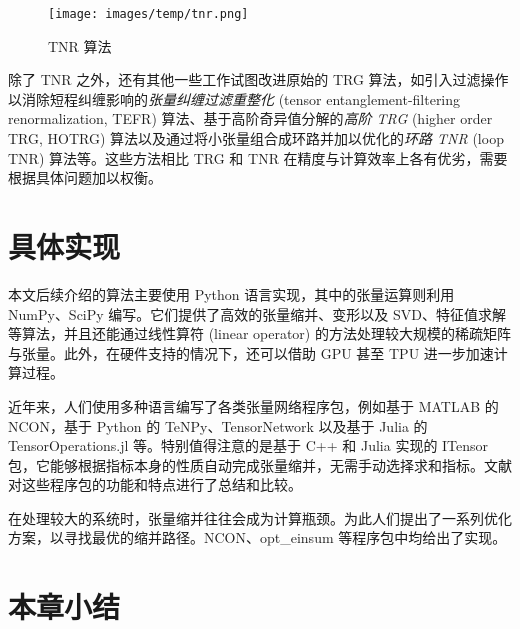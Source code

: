 \begin{figure}[htb]
  \centering
  \texttt{[image: images/temp/tnr.png]}
  \caption{TNR 算法}
  \label{fig:tnr}
\end{figure}

除了 TNR 之外，还有其他一些工作试图改进原始的 TRG 算法，如引入过滤操作以消除短程纠缠影响的\emph{张量纠缠过滤重整化} (tensor entanglement-filtering renormalization, TEFR) 算法\cite{gu2009tensor1}、基于高阶奇异值分解的\emph{高阶 TRG} (higher order TRG, HOTRG) 算法\cite{xie2012coarse}以及通过将小张量组合成环路并加以优化的\emph{环路 TNR} (loop TNR) 算法\cite{yang2017loop}等。这些方法相比 TRG 和 TNR 在精度与计算效率上各有优劣，需要根据具体问题加以权衡。


\section{具体实现}

本文后续介绍的算法主要使用 Python 语言实现，其中的张量运算则利用 NumPy\cite{harris2020array}、SciPy\cite{virtanen2020scipy} 编写。它们提供了高效的张量缩并、变形以及 SVD、特征值求解等算法，并且还能通过线性算符 (linear operator) 的方法处理较大规模的稀疏矩阵与张量。此外，在硬件支持的情况下，还可以借助 GPU 甚至 TPU\cite{ganahl2023density} 进一步加速计算过程。

近年来，人们使用多种语言编写了各类张量网络程序包，例如基于 MATLAB 的 NCON\cite{pfeifer2014ncon}，基于 Python 的 TeNPy\cite{hauschild2018efficient}、TensorNetwork\cite{roberts2019tensornetwork} 以及基于 Julia 的 TensorOperations.jl\cite{jutho2023tensoroperations} 等。特别值得注意的是基于 C++ 和 Julia 实现的 ITensor\cite{fishman2022itensor} 包，它能够根据指标本身的性质自动完成张量缩并，无需手动选择求和指标。文献 \parencite{psarras2021landscape} 对这些程序包的功能和特点进行了总结和比较。

在处理较大的系统时，张量缩并往往会成为计算瓶颈。为此人们提出了一系列优化方案\cite{pfeifer2014faster,evenbly2014improving}，以寻找最优的缩并路径。NCON、opt\_einsum\cite{daniel2018opteinsum} 等程序包中均给出了实现。

\section{本章小结}

